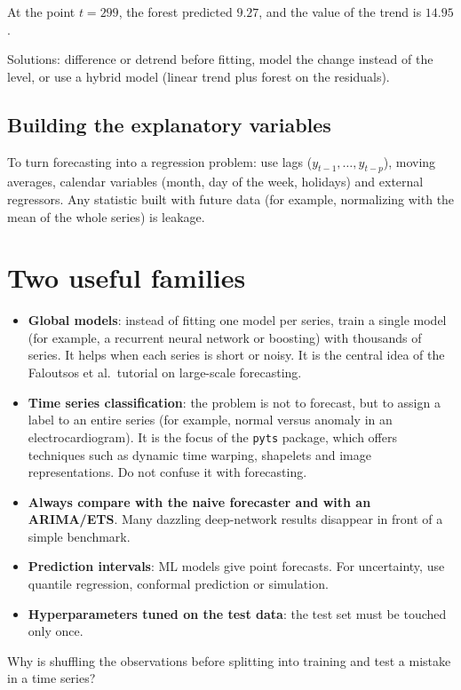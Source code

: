 \begin{simulacao}
At the point $t=299$, the forest predicted $9.27$, and the value of the trend is $14.95$.
\end{simulacao}

Solutions: difference or detrend before fitting, model the change instead of the level, or use a hybrid model (linear trend plus forest on the residuals).

\subsection{Building the explanatory variables}
To turn forecasting into a regression problem: use lags ($y_{t-1},\dots,y_{t-p}$), moving averages, calendar variables (month, day of the week, holidays) and external regressors. Any statistic built with future data (for example, normalizing with the mean of the whole series) is leakage.

\section{Two useful families}
\begin{itemize}[leftmargin=1.4em]
\item \textbf{Global models}: instead of fitting one model per series, train a single model (for example, a recurrent neural network or boosting) with thousands of series. It helps when each series is short or noisy. It is the central idea of the Faloutsos et al.\ tutorial on large-scale forecasting.
\item \textbf{Time series classification}: the problem is not to forecast, but to assign a label to an entire series (for example, normal versus anomaly in an electrocardiogram). It is the focus of the \texttt{pyts} package, which offers techniques such as dynamic time warping, shapelets and image representations. Do not confuse it with forecasting.
\end{itemize}

\begin{atencao}[Pitfalls]
\begin{itemize}[leftmargin=1.2em]
\item \textbf{Always compare with the naive forecaster and with an ARIMA/ETS}. Many dazzling deep-network results disappear in front of a simple benchmark.
\item \textbf{Prediction intervals}: ML models give point forecasts. For uncertainty, use quantile regression, conformal prediction or simulation.
\item \textbf{Hyperparameters tuned on the test data}: the test set must be touched only once.
\end{itemize}
\end{atencao}

\begin{exercicio}
Why is shuffling the observations before splitting into training and test a mistake in a time series?
\end{exercicio}
